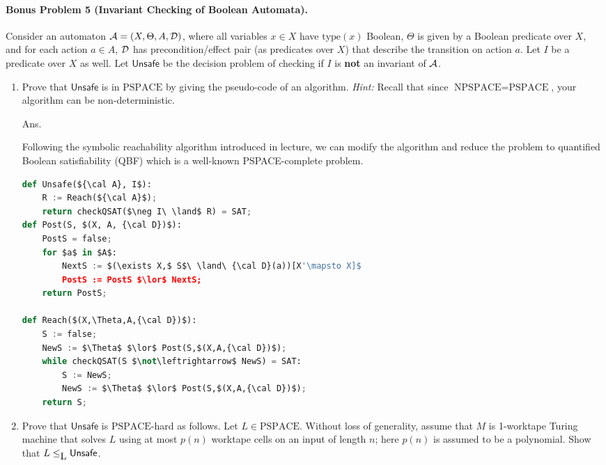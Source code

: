 \documentclass[11pt]{article}
\begin{document}
\paragraph{Bonus Problem 5 (Invariant Checking of Boolean Automata).}
Consider an automaton ${\cal A} = (X,\Theta,A,{\cal D})$, where all
variables $x \in X$ have $\mathrm{type}(x)$ Boolean, $\Theta$ is given
by a Boolean predicate over $X$, and for each action $a \in A$, ${\cal
  D}$ has precondition/effect pair (as predicates over $X$) that
describe the transition on action $a$. Let $I$ be a predicate over $X$
as well. Let $\mathsf{Unsafe}$ be the decision problem of checking if
$I$ is {\bf not} an invariant of ${\cal A}$.
\begin{enumerate}
\item Prove that $\mathsf{Unsafe}$ is in $\mbox{PSPACE}$ by giving the
  pseudo-code of an algorithm. \emph{Hint:} Recall that since
  $\mbox{NPSPACE} = \mbox{PSPACE}$, your algorithm can be
  non-deterministic.
  
Ans.

Following the symbolic reachability algorithm introduced in lecture,
we can modify the algorithm and reduce the problem to quantified Boolean satisfiability (QBF) which is a well-known PSPACE-complete problem.

\begin{lstlisting}[language=Python, mathescape=true]
def Unsafe(${\cal A}, I$):
    R := Reach(${\cal A}$);
    return checkQSAT($\neg I\ \land$ R) = SAT;
def Post(S, $(X, A, {\cal D})$):
    PostS = false;
    for $a$ in $A$:
        NextS := $(\exists X,$ S$\ \land\ {\cal D}(a))[X'\mapsto X]$
        PostS := PostS $\lor$ NextS; 
    return PostS; 

def Reach($(X,\Theta,A,{\cal D})$):
    S := false;
    NewS := $\Theta$ $\lor$ Post(S,$(X,A,{\cal D})$);
    while checkQSAT(S $\not\leftrightarrow$ NewS) = SAT:
        S := NewS;
        NewS := $\Theta$ $\lor$ Post(S,$(X,A,{\cal D})$);
    return S;
\end{lstlisting}

\item Prove that $\mathsf{Unsafe}$ is $\mbox{PSPACE}$-hard as
  follows. Let $L \in \mbox{PSPACE}$. Without loss of generality,
  assume that $M$ is 1-worktape Turing machine that solves $L$ using
  at most $p(n)$ worktape cells on an input of length $n$; here $p(n)$
  is assumed to be a polynomial. Show that $L \leq_{{\mbox L}}
  \mathsf{Unsafe}$.
\end{enumerate}





\end{document}
